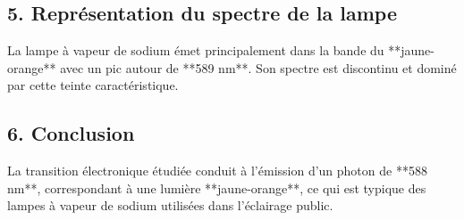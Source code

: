 \documentclass[a4paper,12pt]{article}
\begin{document}
\subsection*{5. Représentation du spectre de la lampe}
La lampe à vapeur de sodium émet principalement dans la bande du **jaune-orange** avec un pic autour de **589 nm**. Son spectre est discontinu et dominé par cette teinte caractéristique.

\subsection*{6. Conclusion}
La transition électronique étudiée conduit à l’émission d’un photon de **588 nm**, correspondant à une lumière **jaune-orange**, ce qui est typique des lampes à vapeur de sodium utilisées dans l’éclairage public.
\end{document}

